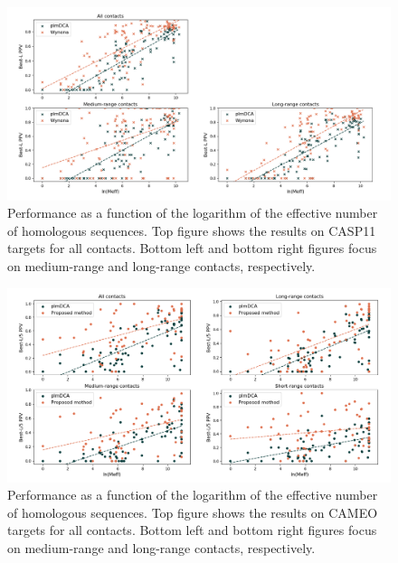     \begin{figure}[H]
        \begin{center}
            \includegraphics[width=\textwidth, keepaspectratio]{imgs/Meff.png}
            \caption{Performance as a function of the logarithm of the effective
            number of homologous sequences. Top figure shows the results on
            CASP11 targets for all contacts. Bottom left and bottom right figures
            focus on medium-range and long-range contacts, respectively.}
            \label{sensitivity}
        \end{center}
    \end{figure}

    \begin{figure}[H]
        \begin{center}
            \includegraphics[width=\textwidth, keepaspectratio]{imgs/Meff_cameo.png}
            \caption{Performance as a function of the logarithm of the effective
            number of homologous sequences. Top figure shows the results on
            CAMEO targets for all contacts. Bottom left and bottom right figures
            focus on medium-range and long-range contacts, respectively.}
            \label{sensitivity}
        \end{center}
    \end{figure}

